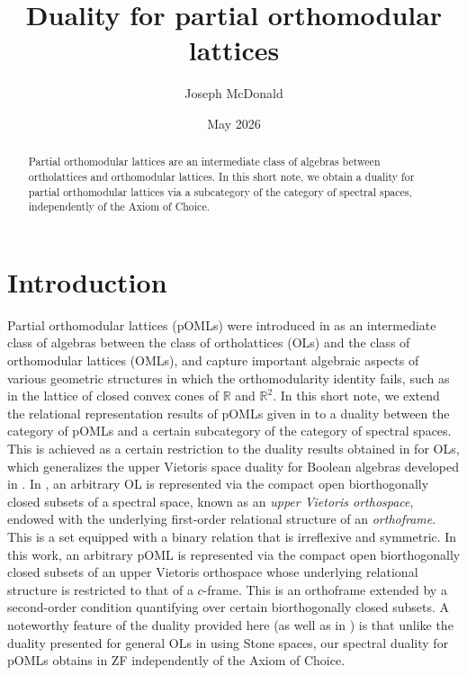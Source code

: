\documentclass{amsart}
\theoremstyle{plain}
\theoremstyle{definition}
\begin{document}
\title[Duality for partial orthomodular lattices]{Duality for partial orthomodular lattices}
\author{Joseph McDonald }
\address{Institute of Computer Science, Czech Academy of Sciences}

\date{May 2026}
\begin{abstract}
  Partial orthomodular lattices are an intermediate class of algebras between ortholattices and orthomodular lattices. In this short note, we obtain a duality for partial orthomodular lattices via a subcategory of the category of spectral spaces, independently of the Axiom of Choice. 
\end{abstract}

\maketitle


\section{Introduction}
Partial orthomodular lattices (pOMLs) were introduced in \cite{leem} as an intermediate class of algebras between the class of ortholattices (OLs) and the class of orthomodular lattices (OMLs), and capture important algebraic aspects of various geometric structures in which the orthomodularity identity fails, such as in the lattice of closed convex cones of $\mathbb{R}$ and $\mathbb{R}^2$. In this short note, we extend the relational representation results of pOMLs given in \cite{leem} to a duality between the category of pOMLs and a certain subcategory of the category of spectral spaces. This is achieved as a certain restriction to the duality results obtained in \cite{mcdonald} for OLs, which generalizes the upper Vietoris space duality for Boolean algebras developed in \cite{bez}. In \cite{mcdonald}, an arbitrary OL is represented via the compact open biorthogonally closed subsets of a spectral space, known as an \emph{upper Vietoris orthospace}, endowed with the underlying first-order relational structure of an \emph{orthoframe}. This is a set equipped with a binary relation that is irreflexive and symmetric. In this work, an arbitrary pOML is represented via the compact open biorthogonally closed subsets of an upper Vietoris orthospace whose underlying relational structure is restricted to that of a $c$-frame. This is an orthoframe extended by a second-order condition quantifying over certain biorthogonally closed subsets. A noteworthy feature of the duality provided here (as well as in \cite{mcdonald}) is that unlike the duality presented for general OLs in \cite{goldblatt1,bimbo} using Stone spaces, our spectral duality for pOMLs obtains in ZF independently of the Axiom of Choice.
 
\end{document}
